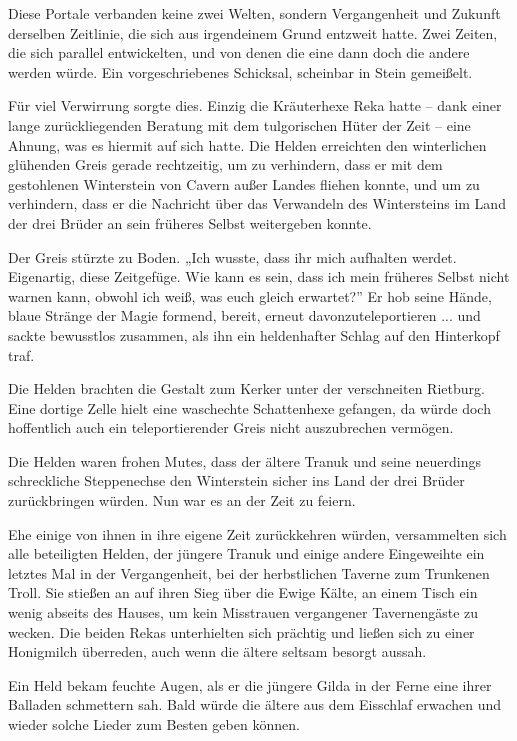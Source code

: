 Diese Portale verbanden keine zwei Welten, sondern Vergangenheit und Zukunft derselben Zeitlinie, die sich aus irgendeinem Grund entzweit hatte. Zwei Zeiten, die sich parallel entwickelten, und von denen die eine dann doch die andere werden würde. Ein vorgeschriebenes Schicksal, scheinbar in Stein gemeißelt.

Für viel Verwirrung sorgte dies. Einzig die Kräuterhexe Reka hatte – dank einer lange zurückliegenden Beratung mit dem tulgorischen Hüter der Zeit – eine Ahnung, was es hiermit auf sich hatte. Die Helden erreichten den winterlichen glühenden Greis gerade rechtzeitig, um zu verhindern, dass er mit dem gestohlenen Winterstein von Cavern außer Landes fliehen konnte, und um zu verhindern, dass er die Nachricht über das Verwandeln des Wintersteins im Land der drei Brüder an sein früheres Selbst weitergeben konnte.



\trennzeichen



Der Greis stürzte zu Boden. „Ich wusste, dass ihr mich aufhalten werdet. Eigenartig, diese Zeitgefüge. Wie kann es sein, dass ich mein früheres Selbst nicht warnen kann, obwohl ich weiß, was euch gleich erwartet?” Er hob seine Hände, blaue Stränge der Magie formend, bereit, erneut davonzuteleportieren ... und sackte bewusstlos zusammen, als ihn ein heldenhafter Schlag auf den Hinterkopf traf.

Die Helden brachten die Gestalt zum Kerker unter der verschneiten Rietburg. Eine dortige Zelle hielt eine waschechte Schattenhexe gefangen, da würde doch hoffentlich auch ein teleportierender Greis nicht auszubrechen vermögen.

Die Helden waren frohen Mutes, dass der ältere Tranuk und seine neuerdings schreckliche Steppenechse den Winterstein sicher ins Land der drei Brüder zurückbringen würden. Nun war es an der Zeit zu feiern.

Ehe einige von ihnen in ihre eigene Zeit zurückkehren würden, versammelten sich alle beteiligten Helden, der jüngere Tranuk und einige andere Eingeweihte ein letztes Mal in der Vergangenheit, bei der herbstlichen Taverne zum Trunkenen Troll. Sie stießen an auf ihren Sieg über die Ewige Kälte, an einem Tisch ein wenig abseits des Hauses, um kein Misstrauen vergangener Tavernengäste zu wecken. Die beiden Rekas unterhielten sich prächtig und ließen sich zu einer Honigmilch überreden, auch wenn die ältere seltsam besorgt aussah. 

Ein Held bekam feuchte Augen, als er die jüngere Gilda in der Ferne eine ihrer Balladen schmettern sah. Bald würde die ältere aus dem Eisschlaf erwachen und wieder solche Lieder zum Besten geben können. 

